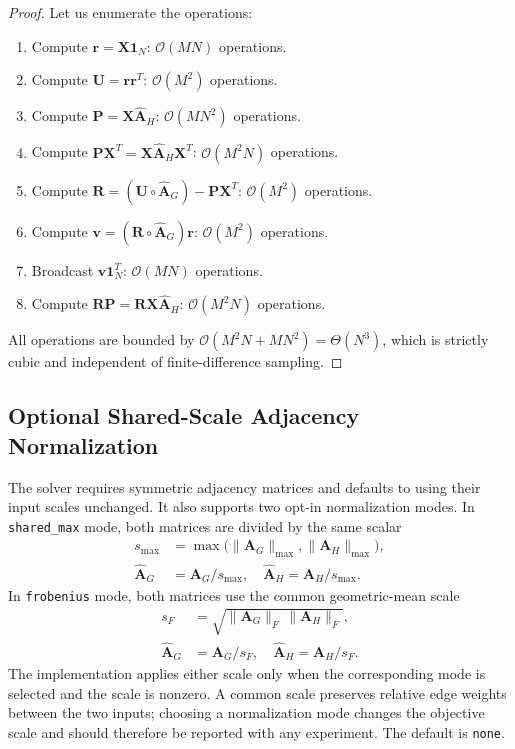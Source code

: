 \documentclass[conference]{IEEEtran}
\begin{document}
\begin{proof}
Let us enumerate the operations:
\begin{enumerate}
    \item Compute $\mathbf{r} = \mathbf{X}\mathbf{1}_N$: $\mathcal{O}(MN)$ operations.
    \item Compute $\mathbf{U} = \mathbf{r}\mathbf{r}^T$: $\mathcal{O}(M^2)$ operations.
    \item Compute $\mathbf{P} = \mathbf{X}\hat{\mathbf{A}}_H$: $\mathcal{O}(MN^2)$ operations.
    \item Compute $\mathbf{P}\mathbf{X}^T = \mathbf{X}\hat{\mathbf{A}}_H\mathbf{X}^T$: $\mathcal{O}(M^2N)$ operations.
    \item Compute $\mathbf{R} = (\mathbf{U} \circ \hat{\mathbf{A}}_G) - \mathbf{P}\mathbf{X}^T$: $\mathcal{O}(M^2)$ operations.
    \item Compute $\mathbf{v} = (\mathbf{R} \circ \hat{\mathbf{A}}_G)\mathbf{r}$: $\mathcal{O}(M^2)$ operations.
    \item Broadcast $\mathbf{v}\mathbf{1}_N^T$: $\mathcal{O}(MN)$ operations.
    \item Compute $\mathbf{R}\mathbf{P} = \mathbf{R}\mathbf{X}\hat{\mathbf{A}}_H$: $\mathcal{O}(M^2N)$ operations.
\end{enumerate}
All operations are bounded by $\mathcal{O}(M^2N + MN^2) = \Theta(N^3)$, which is strictly cubic and independent of finite-difference sampling.
\end{proof}

\subsection{Optional Shared-Scale Adjacency Normalization}
The solver requires symmetric adjacency matrices and defaults to using their input scales unchanged. It also supports two opt-in normalization modes. In \texttt{shared\_max} mode, both matrices are divided by the same scalar
\begin{equation}
\begin{aligned}
s_{\max} &= \max\big(\|\mathbf{A}_G\|_{\max},\|\mathbf{A}_H\|_{\max}\big),\\
\hat{\mathbf{A}}_G &= \mathbf{A}_G/s_{\max},\quad \hat{\mathbf{A}}_H=\mathbf{A}_H/s_{\max}.
\end{aligned}
\label{eq:shared_scale}
\end{equation}
In \texttt{frobenius} mode, both matrices use the common geometric-mean scale
\begin{equation}
\begin{aligned}
s_F &= \sqrt{\|\mathbf{A}_G\|_F\,\|\mathbf{A}_H\|_F},\\
\hat{\mathbf{A}}_G &= \mathbf{A}_G/s_F,\quad \hat{\mathbf{A}}_H=\mathbf{A}_H/s_F.
\end{aligned}
\end{equation}
The implementation applies either scale only when the corresponding mode is selected and the scale is nonzero. A common scale preserves relative edge weights between the two inputs; choosing a normalization mode changes the objective scale and should therefore be reported with any experiment. The default is \texttt{none}.
\end{document}
